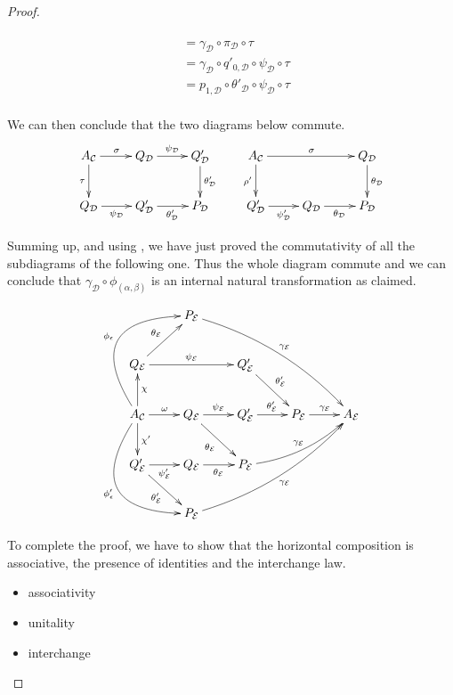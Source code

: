 \documentclass[a4paper,UKenglish,cleveref,pdftex,thm-restate,numberwithinsect]{lipics-v2021}
\def\A{\textbf {\textup{A}}}
\begin{document}
\begin{proof}
\begin{enumerate}
\[\begin{split}
	\\&= \gamma_{\mathcal{D}}\circ \pi_{\mathcal{D}}\circ \tau
	\\&= \gamma_{\mathcal{D}}\circ q'_{0, \mathcal{D}}\circ \psi_{\mathcal{D}}\circ \tau
	\\&= p_{1, \mathcal{D}}\circ \theta'_{\mathcal{D}}\circ \psi_{\mathcal{D}}\circ \tau\\ &
\end{split}\]

We can then conclude that the two diagrams below commute.
\[\xymatrix{A_{\mathcal{C}} \ar[r]^{\sigma}\ar[d]_{\tau} & Q_{\mathcal{D}} \ar[r]^{\psi_{\mathcal{D}}}&Q'_{\mathcal{D}} \ar[d]^{\theta'_{\mathcal{D}}} & A_{\mathcal{C}} \ar[d]_{\rho'}\ar[rr]^{\sigma} && Q_{\mathcal{D}} \ar[d]^{\theta_{\mathcal{D}}}  \\Q_{\mathcal{D}} \ar[r]_{\psi_{\mathcal{D}}}& Q'_{\mathcal{D}} \ar[r]_{\theta'_{\mathcal{D}}} & P_{\mathcal{D}} &Q'_{\mathcal{D}} \ar[r]_{\psi'_{\mathcal{D}}} & Q_{\mathcal{D}} \ar[r]_{\theta_{\mathcal{D}}}& P_{\mathcal{D}}}\]

Summing up, and using , we have just proved the commutativity of all the subdiagrams of the following one. Thus the whole diagram commute and we can conclude that $\gamma_{\mathcal{D}}\circ \phi_{(\alpha, \beta)}$ is an internal natural transformation as claimed.

\[\xymatrix{& P_{\mathcal{E}} \ar@/^.4cm/[ddrrr]^{\gamma_{\mathcal{E}}}\\Q_{\mathcal{E}} \ar[ur]^{\theta_{\mathcal{E}}}\ar[rr]^{\psi_{\mathcal{E}}}&&Q'_{\mathcal{E}} \ar[dr]^{\theta'_{\mathcal{E}}}\\A_{\mathcal{C}} \ar[u]_{\chi} \ar[r]^{\omega}\ar[d]^{\chi'} \ar@/_1.5cm/[ddr]_{\phi'_{\epsilon}}\ar@/^1.5cm/[uur]^{\phi_{\epsilon}}& Q_{\mathcal{E}} \ar[dr]_{\theta_{\mathcal{E}}} \ar[r]^{\psi_{\mathcal{E}}}& Q'_{\mathcal{E}} \ar[r]^{\theta'_{\mathcal{E}}} & P_{\mathcal{E}} \ar[r]^{\gamma_{\mathcal{E}}} & A_{\mathcal{E}}\\ Q'_{\mathcal{E}} \ar[dr]_{\theta'_{\mathcal{E}}} \ar[r]_{\psi'_{\mathcal{E}}}& Q_{\mathcal{E}} \ar[r]_{\theta_{\mathcal{E}}} & P_{\mathcal{E}} \ar@/_.3cm/[urr]^{\gamma_{\mathcal{E}}}\\ & P_{\mathcal{E}} \ar@/_.4cm/[uurrr]_{\gamma_{\mathcal{E}}}}\]


		
			
			To complete the proof, we have to show that the horizontal composition is associative, the presence of identities and the interchange law.
			\begin{itemize}
				
				\item associativity
				\item unitality
				\item interchange\qedhere 
			\end{itemize}
		\end{enumerate}
	\end{proof}
	
\end{document}
